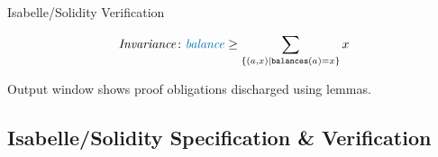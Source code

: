 \documentclass[aspectratio=169]{beamer}
\begin{document}
\begin{frame}{Isabelle/Solidity Verification}
\begin{Example}{}{}
\begin{align*}
		\mathit{Invariance}\colon&\mathit{\color{blue}balance} \geq \sum_{\{(a,x)|\texttt{balances}(a)=x\}} x\\
	\end{align*}
		\begin{center}\vspace{-2mm}
	\end{center}\vspace{-2mm}
Output window shows proof obligations discharged using lemmas.
\end{Example}
\end{frame}
%
\subsection{Isabelle/Solidity Specification \& Verification}
\end{document}
